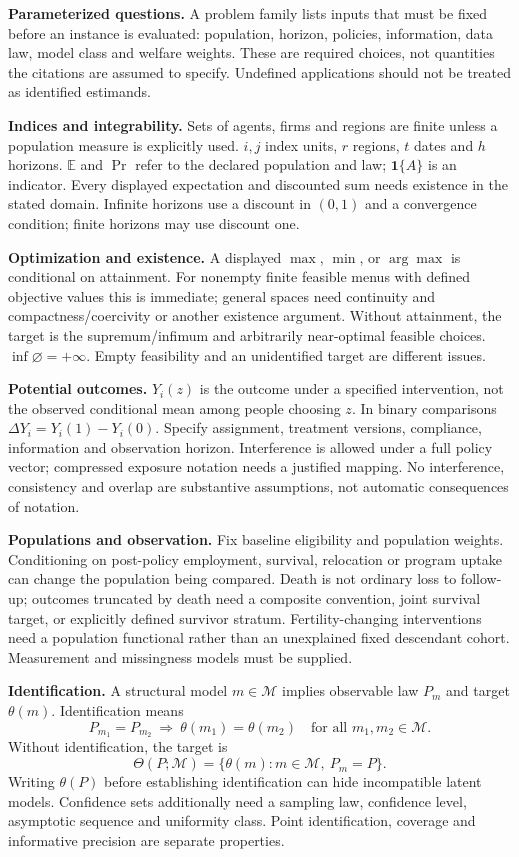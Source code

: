 \documentclass[11pt,a4paper]{article}
\begin{document}
\textbf{Parameterized questions.} A problem family lists inputs that must be fixed before an instance is evaluated: population, horizon, policies, information, data law, model class and welfare weights. These are required choices, not quantities the citations are assumed to specify. Undefined applications should not be treated as identified estimands.

\textbf{Indices and integrability.} Sets of agents, firms and regions are finite unless a population measure is explicitly used. \(i,j\) index units, \(r\) regions, \(t\) dates and \(h\) horizons. \(\mathbb E\) and \(\Pr\) refer to the declared population and law; \(\mathbf1\{A\}\) is an indicator. Every displayed expectation and discounted sum needs existence in the stated domain. Infinite horizons use a discount in \((0,1)\) and a convergence condition; finite horizons may use discount one.

\textbf{Optimization and existence.} A displayed \(\max\), \(\min\), or \(\arg\max\) is conditional on attainment. For nonempty finite feasible menus with defined objective values this is immediate; general spaces need continuity and compactness/coercivity or another existence argument. Without attainment, the target is the supremum/infimum and arbitrarily near-optimal feasible choices. \(\inf\varnothing=+\infty\). Empty feasibility and an unidentified target are different issues.

\textbf{Potential outcomes.} \(Y_i(z)\) is the outcome under a specified intervention, not the observed conditional mean among people choosing \(z\). In binary comparisons \(\Delta Y_i=Y_i(1)-Y_i(0)\). Specify assignment, treatment versions, compliance, information and observation horizon. Interference is allowed under a full policy vector; compressed exposure notation needs a justified mapping. No interference, consistency and overlap are substantive assumptions, not automatic consequences of notation.

\textbf{Populations and observation.} Fix baseline eligibility and population weights. Conditioning on post-policy employment, survival, relocation or program uptake can change the population being compared. Death is not ordinary loss to follow-up; outcomes truncated by death need a composite convention, joint survival target, or explicitly defined survivor stratum. Fertility-changing interventions need a population functional rather than an unexplained fixed descendant cohort. Measurement and missingness models must be supplied.

\textbf{Identification.} A structural model \(m\in\mathcal M\) implies observable law \(P_m\) and target \(\theta(m)\). Identification means
\[
 P_{m_1}=P_{m_2}\ \Longrightarrow\ \theta(m_1)=\theta(m_2)
 \quad\text{for all }m_1,m_2\in\mathcal M .
\]
Without identification, the target is
\[
 \Theta(P;\mathcal M)=\{\theta(m):m\in\mathcal M,\ P_m=P\}.
\]
Writing \(\theta(P)\) before establishing identification can hide incompatible latent models. Confidence sets additionally need a sampling law, confidence level, asymptotic sequence and uniformity class. Point identification, coverage and informative precision are separate properties.
\end{document}
